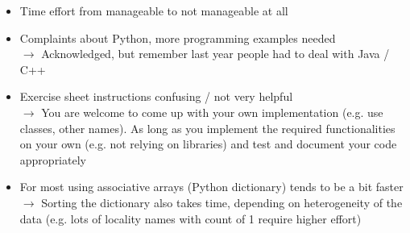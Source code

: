 \begin{frame}{\LectureFeedbackExercisesTitle}
  \begin{itemize}
\item<1-> Time effort from manageable to not manageable at all

\item<2-> Complaints about Python, more programming examples needed\\
$\rightarrow$ Acknowledged, but remember last year people had to deal with Java / C++

\item<3-> Exercise sheet instructions confusing / not very helpful\\
$\rightarrow$ You are welcome to come up with your own implementation (e.g. use classes, other names). As long as you implement the required functionalities on your own (e.g. not relying on libraries) and test and document your code appropriately

\item<4-> For most using associative arrays (Python dictionary) tends to be a bit faster\\
$\rightarrow$ Sorting the dictionary also takes time, depending on heterogeneity of the data (e.g. lots of locality names with count of 1 require higher effort)
\end{itemize}

\end{frame}
